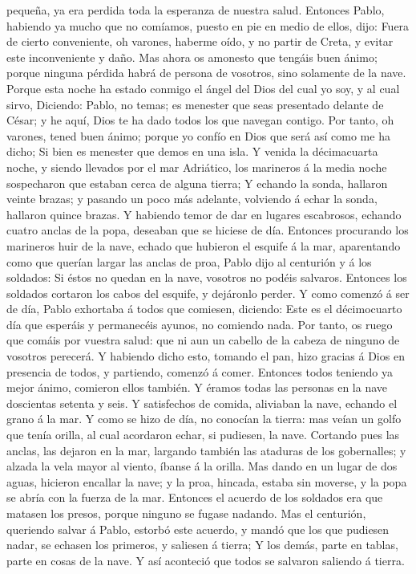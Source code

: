 pequeña, ya era perdida toda la esperanza de nuestra salud.
 Entonces Pablo, habiendo ya mucho que no comíamos,
puesto en pie en medio de ellos, dijo: Fuera de cierto conveniente, oh
varones, haberme oído, y no partir de Creta, y evitar este inconveniente
y daño.  Mas ahora os amonesto que tengáis buen ánimo;
porque ninguna pérdida habrá de persona de vosotros, sino solamente de
la nave.  Porque esta noche ha estado conmigo el ángel
del Dios del cual yo soy, y al cual sirvo,  Diciendo:
Pablo, no temas; es menester que seas presentado delante de César; y he
aquí, Dios te ha dado todos los que navegan contigo.  Por
tanto, oh varones, tened buen ánimo; porque yo confío en Dios que será
así como me ha dicho;  Si bien es menester que demos en
una isla.  Y venida la décimacuarta noche, y siendo
llevados por el mar Adriático, los marineros á la media noche
sospecharon que estaban cerca de alguna tierra;  Y
echando la sonda, hallaron veinte brazas; y pasando un poco más
adelante, volviendo á echar la sonda, hallaron quince brazas.
 Y habiendo temor de dar en lugares escabrosos, echando
cuatro anclas de la popa, deseaban que se hiciese de día.
 Entonces procurando los marineros huir de la nave,
echado que hubieron el esquife á la mar, aparentando como que querían
largar las anclas de proa,  Pablo dijo al centurión y á
los soldados: Si éstos no quedan en la nave, vosotros no podéis
salvaros.  Entonces los soldados cortaron los cabos del
esquife, y dejáronlo perder.  Y como comenzó á ser de
día, Pablo exhortaba á todos que comiesen, diciendo: Este es el
décimocuarto día que esperáis y permanecéis ayunos, no comiendo nada.
 Por tanto, os ruego que comáis por vuestra salud: que ni
aun un cabello de la cabeza de ninguno de vosotros perecerá.
 Y habiendo dicho esto, tomando el pan, hizo gracias á
Dios en presencia de todos, y partiendo, comenzó á comer.
 Entonces todos teniendo ya mejor ánimo, comieron ellos
también.  Y éramos todas las personas en la nave
doscientas setenta y seis.  Y satisfechos de comida,
aliviaban la nave, echando el grano á la mar.  Y como se
hizo de día, no conocían la tierra: mas veían un golfo que tenía orilla,
al cual acordaron echar, si pudiesen, la nave.  Cortando
pues las anclas, las dejaron en la mar, largando también las ataduras de
los gobernalles; y alzada la vela mayor al viento, íbanse á la orilla.
 Mas dando en un lugar de dos aguas, hicieron encallar la
nave; y la proa, hincada, estaba sin moverse, y la popa se abría con la
fuerza de la mar.  Entonces el acuerdo de los soldados
era que matasen los presos, porque ninguno se fugase nadando.
 Mas el centurión, queriendo salvar á Pablo, estorbó este
acuerdo, y mandó que los que pudiesen nadar, se echasen los primeros, y
saliesen á tierra;  Y los demás, parte en tablas, parte
en cosas de la nave. Y así aconteció que todos se salvaron saliendo á
tierra.

